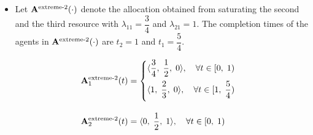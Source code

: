 \documentclass[letterpaper]{article} %
\theoremstyle{definition}
\newenvironment{customexample}[1]
  {\renewcommand\theinnercustomexample{#1}\innercustomexample}
  {\endinnercustomexample}
\begin{document}
\begin{customexample}{1}
\begin{itemize}
    \item Let $\mathbf{A}^{\textnormal{extreme-2}}(\cdot)$ denote the allocation obtained from saturating the second and the third resource with $\lambda_{11} = \dfrac{3}{4}$ and $\lambda_{21} = 1$. The completion times of the agents in $\mathbf{A}^{\textnormal{extreme-2}}(\cdot)$ are $t_{2} = 1$ and $t_{1} = \dfrac{5}{4}$.\\
    \begin{linenomath}
    \begin{equation*}
    \begin{split}
    \mathbf{A}^{\textnormal{extreme-2}}_{1}(t) & = \begin{cases} \langle \dfrac{3}{4}, \; \dfrac{1}{2}, \; 0 \rangle, \quad \forall t \in [0, \; 1)\\[8 pt] 
    \langle 1, \; \dfrac{2}{3}, \; 0\rangle, \quad \forall t \in [1, \; \dfrac{5}{4}) \\[8 pt] \end{cases} \\[8 pt]
    \mathbf{A}^{\textnormal{extreme-2}}_{2}(t) & = \langle 0, \; \dfrac{1}{2}, \;  1 \rangle, \quad \forall t \in [0, \; 1)\\[4 pt]
    \end{split}    
    \end{equation*}
    \end{linenomath}
    
\end{itemize}


\end{customexample}
\end{document}
